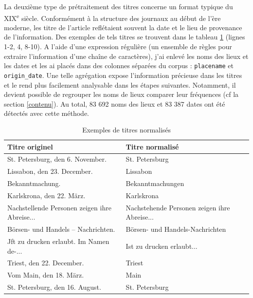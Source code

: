 \documentclass[a4paper,twoside,12pt]{article}
\begin{document}
La deuxième type de prétraitement des titres concerne un format typique du XIX\textsuperscript{e} siècle. Conformément à la structure des journaux au début de l'ère moderne, les titre de l'article reflétaient souvent la date et le lieu de provenance de l'information. Des exemples de tels titres se trouvent dans le tableau \ref{table:titles_normalised} (lignes 1-2, 4, 8-10). A l'aide d'une expression régulière (un ensemble de règles pour extraire l'information d'une chaîne de caractères), j'ai enlevé les noms des lieux et les dates et les ai placés dans des colonnes séparées du corpus : \texttt{placename} et \texttt{origin\_date}. Une telle agrégation expose l'information précieuse dans les titres et le rend plus facilement analysable dans les étapes suivantes. Notamment, il devient possible de regrouper les noms de lieux comparer leur fréquences (cf la section \ref{contenu}). Au total, 83 692 noms des lieux et 83 387 dates ont été détectés avec cette méthode.

\begin{table}[]
    \centering
    \small
    \begin{tabular}{lll}
\toprule
                               Titre originel &                                           Titre normalisé \\
\midrule
                   St. Petersburg, den 6. November. &                                     St. Petersburg \\
                        Lissabon, den 23. December. &                                           Lissabon \\
                                    Bekanntmachung. &                                   Bekanntmachungen \\
                          Karlskrona, den 22. März. &                                         Karlskrona \\
      Nachstellende Personen zeigen ihre Abreise... &       Nachstehende Personen zeigen ihre Abreise... \\
                 Börsen- und Handels – Nachrichten. &                    Börsen- und Handels-Nachrichten \\
            Jft zu drucken erlaubt. Im Namen de-... &                          Ist zu drucken erlaubt... \\
                          Triest, den 22. December. &                                             Triest \\
                            Vom Main, den 18. März. &                                               Main \\
                    St. Petersburg, den 16. August. &                                     St. Petersburg \\
\bottomrule
\end{tabular}
    \caption{Exemples de titres normalisés}
    \label{table:titles_normalised}
\end{table}
\end{document}
